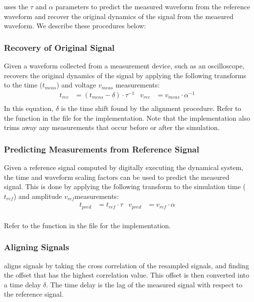 \expdriver uses the $\tau$ and $\alpha$ parameters to predict the measured
waveform from the reference waveform and recover the original dynamics of the
signal from the measured waveform. We describe these procedures below:

\subsubsection{Recovery of Original Signal}

Given a waveform collected from a
measurement device, such as an oscilloscope, \expdriver recovers the original
dynamics of the signal by applying the following transforms to the time ($t_{meas}$)
and voltage $v_{meas}$ measurements:
\begin{align}
t_{rec} &= (t_{meas} - \delta) \cdot \tau^{-1} & v_{rec} &= v_{meas} \cdot \alpha^{-1} \\
\end{align}
In this equation, $\delta$ is the time shift found by the alignment procedure.
Refer to the  function in the  file for the
implementation. Note that the implementation also trims away any measurements
that occur before or after the simulation.


\subsubsection{Predicting Measurements from Reference Signal}
Given a
reference signal computed by digitally executing the dynamical system, the
time and waveform scaling factors can be used to predict the measured signal.
This is done by applying the following transform to the simulation time
($t_{ref}$) and amplitude $v_{ref}$measurements:
\begin{align}
t_{pred} &= t_{ref} \cdot \tau & v_{pred} &= v_{ref} \cdot \alpha \\
\end{align}

Refer to the  function in the  file for the
implementation.

\subsubsection{Aligning Signals}

\expdriver aligns signals by taking the
cross correlation of the resampled signals, and finding the offset that has the
highest correlation value. This offset is then converted into a time delay
$\delta$. The time delay is the lag of the measured signal with respect to the
reference signal. 